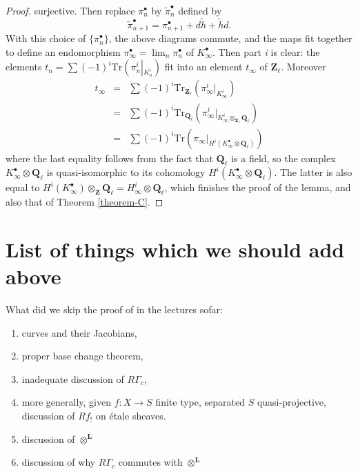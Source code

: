 \begin{proof}
surjective. Then replace $\pi_n^\bullet$ by $\tilde\pi_n^\bullet$ defined by
$$
\tilde\pi_{n+1}^\bullet = \pi_{n+1}^\bullet + d\tilde h+\tilde hd.
$$
With this choice of $\{\pi_n^\bullet\}$, the above diagrams commute, and the
maps fit together to define an endomorphism $\pi_\infty^\bullet =
\lim_n\pi_n^\bullet$ of $K_\infty^\bullet$. Then part {\it i} is clear:
the elements $t_n = \sum(-1)^i
\text{Tr}\left(\pi_n^i\left|_{K_n^i}\right.\right)$ fit into an element
$t_\infty$ of $\mathbf{Z}_\ell$. Moreover
\begin{eqnarray*}
t_\infty & = & \sum(-1)^i
\text{Tr}_{\mathbf{Z}_\ell}\left(\pi_\infty^i\big|_{K_\infty^i}\right) \\
& = & \sum(-1)^i
\text{Tr}_{\mathbf{Q}_\ell}\left(
\pi_\infty^i\big|_{K_\infty^i \otimes_{\mathbf{Z}_\ell}\mathbf{Q}_\ell}
\right) \\
& =
&\sum(-1)^i\text{Tr}\left(
\pi_\infty\big|_{H^i(K_\infty^\bullet \otimes \mathbf{Q}_\ell)}
\right)
\end{eqnarray*}
where the last equality follows from the fact that $\mathbf{Q}_\ell$ is a
field, so the complex $K_\infty^\bullet \otimes \mathbf{Q}_\ell$ is
quasi-isomorphic to its cohomology
$H^i(K_\infty^\bullet \otimes \mathbf{Q}_\ell)$. The latter is also equal to
$H^i(K_\infty^\bullet)\otimes_{\mathbf{Z}}\mathbf{Q}_\ell = H_\infty^i \otimes
\mathbf{Q}_\ell$, which finishes the proof of the lemma, and also that of
Theorem \ref{theorem-C}.
\end{proof}




\section{List of things which we should add above}
\label{section-list-skipped}

\noindent
What did we skip the proof of in the lectures sofar:
\begin{enumerate}
\item curves and their Jacobians,
\item proper base change theorem,
\item inadequate discussion of $R\Gamma_c$,
\item more generally, given $f : X \to S$ finite type,
separated $S$ quasi-projective, discussion of $Rf_!$ on \'etale sheaves.
\item discussion of $\otimes^{\mathbf{L}}$
\item discussion of why $R\Gamma_c$ commutes with $\otimes^{\mathbf{L}}$
\end{enumerate}






